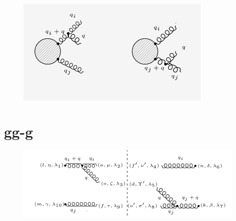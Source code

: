 

\begin{figure}[ht!]
\centering
\includegraphics[width=0.85\textwidth]{images/GGG/GGDiagrams.png}
\end{figure}
\pagebreak
\section{gg-g}
\begin{figure}[ht!]
\centering
\includegraphics[scale=0.7]{images/GGG/ggg.png}
\end{figure}
%
